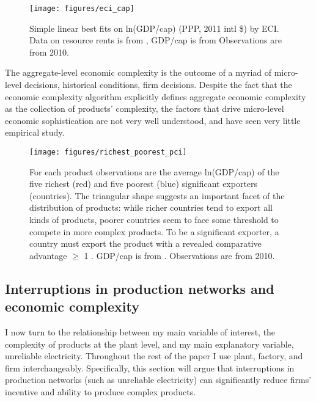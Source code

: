 \documentclass[11pt]{article}
\begin{document}
\begin{figure}[htpb]
	\centering
	\texttt{[image: figures/eci\_cap]}
	\caption[GDP per capita and Economic Complexity]{Simple linear best fits on ln(GDP/cap) (PPP, 2011 intl \$) by ECI. Data on resource rents is from \cite{world_bank_world_2020}, GDP/cap is from \cite{world_bank_world_2020-1} Observations are from 2010.}
	\label{fig:framework-eci-gdp}
\end{figure}

The aggregate-level economic complexity is the outcome of a myriad of micro-level decisions, historical conditions, firm decisions. Despite the fact that the economic complexity algorithm explicitly defines aggregate economic complexity as the collection of products' complexity, the factors that drive micro-level economic sophistication are not very well understood, and have seen very little empirical study.

\begin{figure}[htpb]
	\centering
	\texttt{[image: figures/richest\_poorest\_pci]}
	\caption[Product sophistication by richest and poorest exporters]{For each product observations are the average ln(GDP/cap) of the five richest (red) and five poorest (blue) significant exporters (countries). The triangular shape suggests an important facet of the distribution of products: while richer countries tend to export all kinds of products, poorer countries seem to face some threshold to compete in more complex products. To be a significant exporter, a country must export the product with a revealed comparative advantage \(\geq\) 1  \citep{balassa_trade_1965}. GDP/cap is from \cite{world_bank_world_2020-1}. Observations are from 2010.}%
	\label{fig:framework-least-most}
\end{figure}

\subsection{Interruptions in production networks and economic complexity}
\label{sec:production_networks}
I now turn to the relationship between my main variable of interest, the complexity of products at the plant level, and my main explanatory variable, unreliable electricity. Throughout the rest of the paper I use plant, factory, and firm interchangeably. Specifically, this section will argue that interruptions in production networks (such as unreliable electricity) can significantly reduce firms' incentive and ability to produce complex products.
\end{document}
